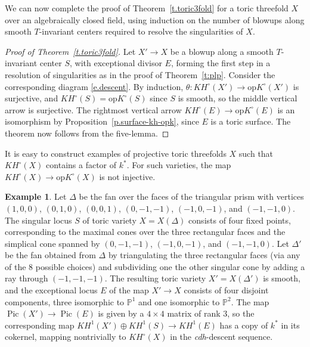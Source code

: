 \documentclass[11pt]{amsart}
\theoremstyle{definition}
\newtheorem{example}[theorem]{Example}
\begin{document}
We can now complete the proof of Theorem~\ref{t.toric3fold} for a toric threefold $X$ over an algebraically closed field, using induction on the number of blowups along smooth $T$-invariant centers required to resolve the singularities of $X$.

\begin{proof}[Proof of Theorem~\ref{t.toric3fold}]
Let $X' \to X$ be a blowup along a smooth $T$-invariant center $S$, with exceptional divisor $E$, forming the first step in a resolution of singularities as in the proof of Theorem~\ref{t:plp}.  Consider the corresponding diagram \eqref{e.descent}.  By induction, $\theta: KH^\circ(X') \rightarrow {\mathrm{op}K}^\circ(X')$ is surjective, and $KH^\circ(S) = {\mathrm{op}K}^\circ(S)$ since $S$ is smooth, so the middle vertical arrow is surjective.  The rightmost vertical arrow $KH^\circ(E) \to {\mathrm{op}K}^\circ(E)$ is an isomorphism by Proposition~\ref{p.surface-kh-opk}, since $E$ is a toric surface.  The theorem now follows from the five-lemma.
\end{proof}

It is easy to construct examples of projective toric threefolds $X$ such that $KH^\circ(X)$ contains a factor of $k^*$.  For such varieties, the map $KH^\circ(X) \to {\mathrm{op}K}^\circ(X)$ is not injective.

\begin{example}\label{ex:toric3}
Let $\Delta$ be the fan over the faces of the triangular prism with vertices $(1,0,0)$, $(0,1,0)$, $(0,0,1)$, $(0,-1,-1)$, $(-1,0,-1)$, and $(-1,-1,0)$.  The singular locus $S$ of toric variety $X=X(\Delta)$ consists of four fixed points, corresponding to the maximal cones over the three rectangular faces and the simplical cone spanned by $(0,-1,-1)$, $(-1,0,-1)$, and $(-1,-1,0)$.  Let $\Delta'$ be the fan obtained from $\Delta$ by triangulating the three rectangular faces (via any of the $8$ possible choices) and subdividing one the other singular cone by adding a ray through $(-1,-1,-1)$.  The resulting toric variety $X'=X(\Delta')$ is smooth, and the exceptional locus $E$ of the map $X' \to X$ consists of four disjoint components, three isomorphic to ${\mathbb{P}}^1$ and one isomorphic to ${\mathbb{P}}^2$.  The map $\operatorname{Pic}(X') \to \operatorname{Pic}(E)$ is given by a $4\times 4$ matrix of rank $3$, so the corresponding map $KH^1(X') \oplus KH^1(S) \to KH^1(E)$ has a copy of $k^*$ in its cokernel, mapping nontrivially to $KH^\circ(X)$ in the {\em cdh}-descent sequence.
\end{example}
\end{document}
